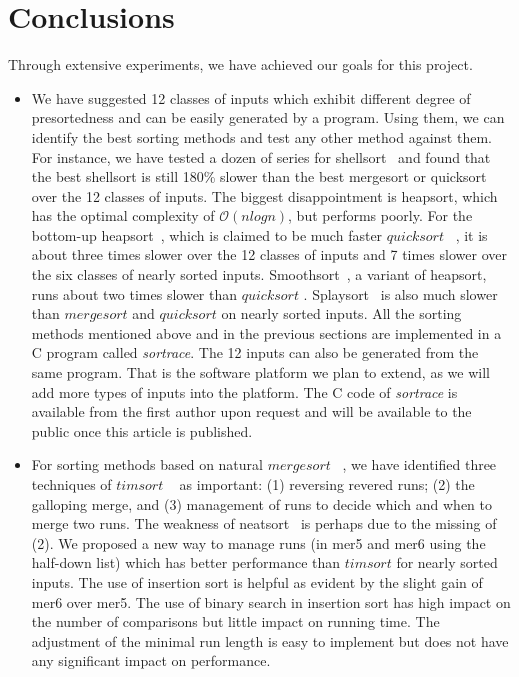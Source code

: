 \documentclass[AMA,STIX1COL]{WileyNJD-v2}
\newcommand{\qusort}{$quicksort$ }
\newcommand{\tsort}{$timsort$ }
\newcommand{\msort}{$mergesort$ }
\begin{document}
\section{Conclusions}
Through extensive experiments, we have achieved our goals for this project. 
\begin{itemize}
\item We have suggested 12 classes of inputs which exhibit different degree of presortedness and can be easily generated by a program. 
Using them, we can identify the best sorting methods and test any other method against them. 
For instance, we have tested a dozen of series for shellsort~\cite{knuth97} and found that the best shellsort is still 180\% slower than the best mergesort or quicksort over the 12 classes of inputs. 
The biggest disappointment is heapsort, which has the optimal complexity of $\mathcal{O}(nlogn)$, but performs poorly. 
For the bottom-up heapsort~\cite{williams1964algorithm}, which is claimed to be much faster \qusort~\cite{wegener1993bottom}, it is about three times slower over the 12 classes of inputs and 7 times slower over the six classes of nearly sorted inputs. 
Smoothsort~\cite{dijkstra1982smoothsort}, a variant of heapsort, runs about two times slower than \qusort. 
Splaysort~\cite{moffat1996splaysort} is also much slower than \msort and \qusort on nearly sorted inputs. 
All the sorting methods  mentioned above and in the previous sections are implemented in a C program called \textit{sortrace}. 
The 12 inputs can also be generated from the same program. 
That is the software platform we plan to extend, as we will add more types of inputs into the platform. 
The C code of \textit{sortrace} is available from the first author upon request and will be available to the public once this article is published.
\item For sorting methods based on natural \msort~\cite{mcilroy1993optimistic}, we have identified three techniques of \tsort~\cite{timsort} as important: (1) reversing revered runs; (2) the galloping merge, and (3) management of runs to decide which and when to merge two runs. 
The weakness of neatsort~\cite{la2014neatsort} is perhaps due to the missing of (2). 
We proposed a new way to manage runs (in mer5 and mer6 using the half-down list) which has better performance than \tsort for nearly sorted inputs. 
The use of insertion sort is helpful as evident by the slight gain of mer6 over mer5. 
The use of binary search in insertion sort has high impact on the number of comparisons but little impact on running time. 
The adjustment of the minimal run length is easy to implement but does not have any significant impact on performance.

\end{itemize}
\end{document}
